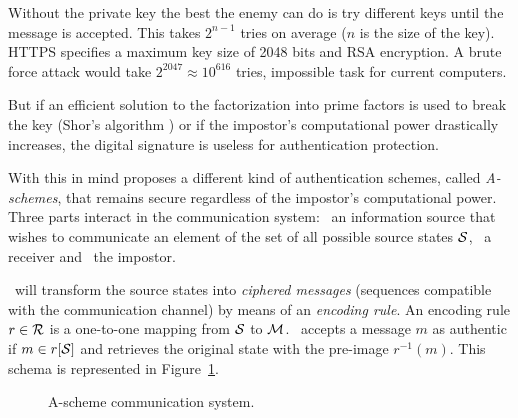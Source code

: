 \documentclass[conference]{IEEEtran}
\begin{document}
Without the private key the best the enemy can do is try different keys until the message is accepted. This takes $2^{n-1}$ tries on average ($n$ is the size of the key). HTTPS specifies a maximum key size of 2048 bits and RSA encryption. A brute force attack would take $2^{2047} \approx 10^{616}$ tries, impossible task for current computers.

But if an efficient solution to the factorization into prime factors is used to break the key (Shor's algorithm \cite{b1}) or if the impostor's computational power drastically increases, the digital signature is useless for authentication protection.

With this in mind \cite{b2} proposes a different kind of authentication schemes, called \textit{A-schemes}, that remains secure regardless of the impostor's computational power. Three parts interact in the communication system: \A\ an information source that wishes to communicate an element of the set of all possible source states $\mathcal S$, \B\ a receiver and \E\ the impostor.

\A\ will transform the source states into \textit{ciphered messages} (sequences compatible with the communication channel) by means of an \textit{encoding rule}. An encoding rule $r\in\mathcal R$ is a one-to-one mapping from $\mathcal S$ to $\mathcal M$. \B\ accepts a message $m$ as authentic if $m\in r[\mathcal S]$ and retrieves the original state with the pre-image $r^{-1}(m)$. This schema is represented in Figure~\ref{figModelo3Participantes}.

\begin{figure}
    \centering
    \caption{A-scheme communication system.}
    \label{figModelo3Participantes}
\end{figure}
\end{document}
